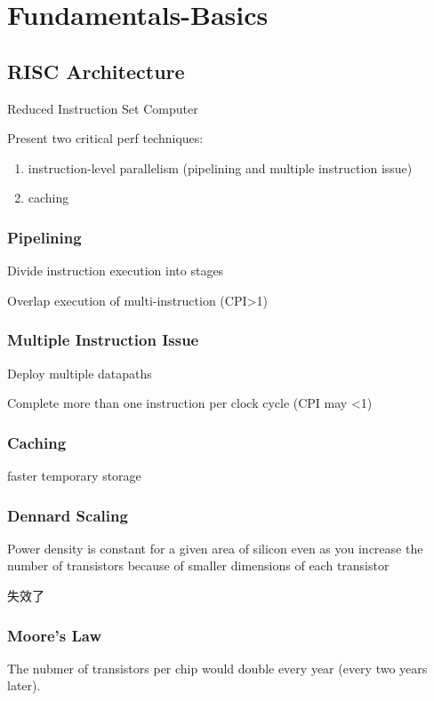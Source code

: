 \newpage
\section{Fundamentals-Basics}

\subsection{RISC Architecture}
Reduced Instruction Set Computer

Present two critical perf techniques: 

\begin{enumerate}
    \item instruction-level parallelism (pipelining and multiple instruction issue)
    \item caching
\end{enumerate}

\subsubsection{Pipelining}
Divide instruction execution into stages

Overlap execution of multi-instruction (CPI>1)


\subsubsection{Multiple Instruction Issue}
Deploy multiple datapaths

Complete more than one instruction per clock cycle (CPI may <1)

\subsubsection{Caching}
faster temporary storage


\subsubsection{Dennard Scaling}
Power density is constant for a given area of silicon even as you increase the number of transistors because of smaller dimensions of each transistor

失效了

\subsubsection{Moore's Law}
The nubmer of transistors per chip would double every year (every two years later). 

